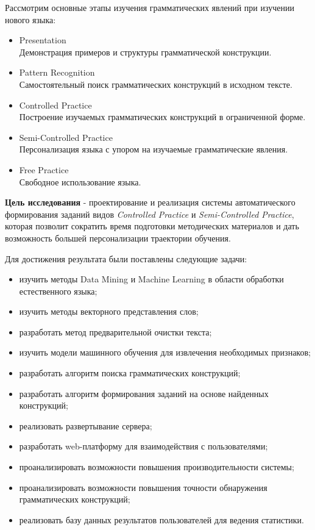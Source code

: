 Рассмотрим основные этапы изучения грамматических явлений при изучении нового языка:

\begin{itemize}
  \item Presentation \\ Демонстрация примеров и структуры грамматической конструкции.
  \item Pattern Recognition\\Самостоятельный поиск грамматических конструкций в исходном тексте.
 \item Controlled Practice\\Построение изучаемых грамматических конструкций в ограниченной форме.
 \item Semi-Controlled Practice\\Персонализация языка с упором на изучаемые грамматические явления.
 \item Free Practice\\Свободное использование языка.
\end{itemize}

\textbf{Цель исследования} - проектирование и реализация системы автоматического формирования заданий видов \emph{Controlled Practice} и \emph{Semi-Controlled Practice}, которая позволит сократить время подготовки методических материалов и дать возможность большей персонализации траектории обучения.

Для достижения результата были поставлены следующие задачи:

\begin{itemize}
  \item изучить методы Data Mining и Machine Learning в области обработки естественного языка; 
  \item изучить методы векторного представления слов;
  \item разработать метод предварительной очистки текста;
  \item изучить модели машинного обучения для извлечения необходимых признаков;
  \item разработать алгоритм поиска грамматических конструкций;
  \item разработать алгоритм формирования заданий на основе найденных конструкций;
  \item реализовать развертывание сервера;
  \item разработать web-платформу для взаимодействия с пользователями;
  \item проанализировать возможности повышения производительности системы;
  \item проанализировать возможности повышения точности обнаружения грамматических конструкций;
  \item реализовать базу данных результатов пользователей для ведения статистики.
\end{itemize}

